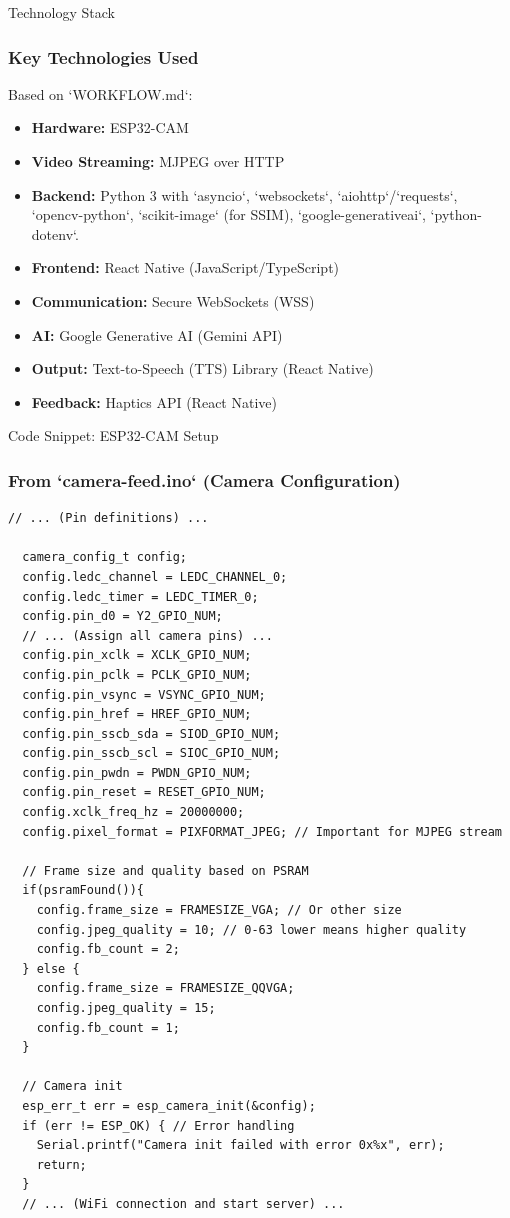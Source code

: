 \documentclass{beamer}
\begin{document}
\begin{frame}{Technology Stack}
    \frametitle{Key Technologies Used}
    Based on `WORKFLOW.md`:
    \begin{itemize}
        \item \textbf{Hardware:} ESP32-CAM
        \item \textbf{Video Streaming:} MJPEG over HTTP
        \item \textbf{Backend:} Python 3 with `asyncio`, `websockets`, `aiohttp`/`requests`, `opencv-python`, `scikit-image` (for SSIM), `google-generativeai`, `python-dotenv`.
        \item \textbf{Frontend:} React Native (JavaScript/TypeScript)
        \item \textbf{Communication:} Secure WebSockets (WSS)
        \item \textbf{AI:} Google Generative AI (Gemini API)
        \item \textbf{Output:} Text-to-Speech (TTS) Library (React Native)
        \item \textbf{Feedback:} Haptics API (React Native)
    \end{itemize}
\end{frame}

\begin{frame}[fragile]{Code Snippet: ESP32-CAM Setup}
  \frametitle{From `camera-feed.ino` (Camera Configuration)}
    \begin{lstlisting}[style=customc, firstnumber=88, numbers=none]
  // ... (Pin definitions) ...

  camera_config_t config;
  config.ledc_channel = LEDC_CHANNEL_0;
  config.ledc_timer = LEDC_TIMER_0;
  config.pin_d0 = Y2_GPIO_NUM;
  // ... (Assign all camera pins) ...
  config.pin_xclk = XCLK_GPIO_NUM;
  config.pin_pclk = PCLK_GPIO_NUM;
  config.pin_vsync = VSYNC_GPIO_NUM;
  config.pin_href = HREF_GPIO_NUM;
  config.pin_sscb_sda = SIOD_GPIO_NUM;
  config.pin_sscb_scl = SIOC_GPIO_NUM;
  config.pin_pwdn = PWDN_GPIO_NUM;
  config.pin_reset = RESET_GPIO_NUM;
  config.xclk_freq_hz = 20000000;
  config.pixel_format = PIXFORMAT_JPEG; // Important for MJPEG stream

  // Frame size and quality based on PSRAM
  if(psramFound()){
    config.frame_size = FRAMESIZE_VGA; // Or other size
    config.jpeg_quality = 10; // 0-63 lower means higher quality
    config.fb_count = 2;
  } else {
    config.frame_size = FRAMESIZE_QQVGA;
    config.jpeg_quality = 15;
    config.fb_count = 1;
  }

  // Camera init
  esp_err_t err = esp_camera_init(&config);
  if (err != ESP_OK) { // Error handling
    Serial.printf("Camera init failed with error 0x%x", err);
    return;
  }
  // ... (WiFi connection and start server) ...
    \end{lstlisting}
\end{frame}
\end{document}

